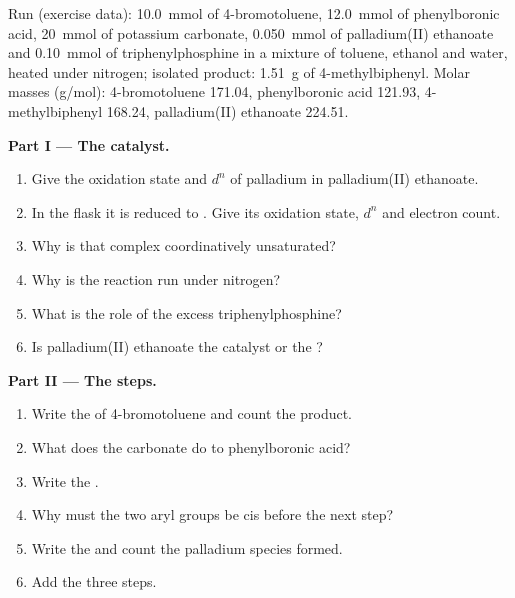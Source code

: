 \begin{problem}
\label{pb:b2:catalytic-cycles:1}
Run (exercise data): \qty{10.0}{mmol} of 4-bromotoluene, \qty{12.0}{mmol} of
phenylboronic acid, \qty{20}{mmol} of potassium carbonate, \qty{0.050}{mmol} of palladium(II)
ethanoate and \qty{0.10}{mmol} of triphenylphosphine in a mixture of toluene, ethanol and
water, heated under nitrogen; isolated product: \qty{1.51}{g} of 4-methylbiphenyl. Molar
masses (\unit{g/mol}): 4-bromotoluene 171.04, phenylboronic acid 121.93, 4-methylbiphenyl
168.24, palladium(II) ethanoate 224.51.

\medskip
\noindent\textbf{Part I --- The catalyst.}
\begin{enumerate}
  \item Give the oxidation state and $d^n$ of palladium in palladium(II) ethanoate.
  \item In the flask it is reduced to . Give its oxidation state, $d^n$ and
        electron count.
  \item Why is that complex coordinatively unsaturated?
  \item Why is the reaction run under nitrogen?
  \item What is the role of the excess triphenylphosphine?
  \item Is palladium(II) ethanoate the catalyst or the ?
\end{enumerate}

\medskip
\noindent\textbf{Part II --- The steps.}
\begin{enumerate}[resume]
  \item Write the  of 4-bromotoluene and count the product.
  \item What does the carbonate do to phenylboronic acid?
  \item Write the .
  \item Why must the two aryl groups be cis before the next step?
  \item Write the  and count the palladium species formed.
  \item Add the three steps.
\end{enumerate}


\end{problem}
